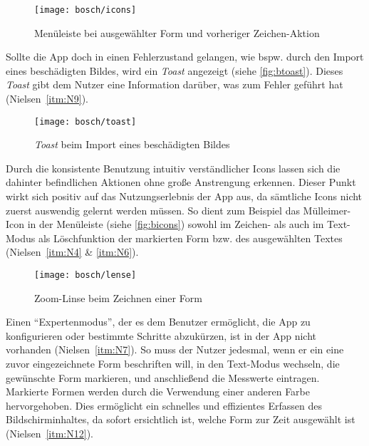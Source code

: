 \begin{figure}[h]
  \centering
  \texttt{[image: bosch/icons]}
  \caption{Menüleiste bei ausgewählter Form und vorheriger Zeichen-Aktion}
  \label{fig:bicons}
\end{figure}

Sollte die App doch in einen Fehlerzustand gelangen, wie bspw. durch den Import eines beschädigten Bildes, wird ein \emph{Toast} angezeigt (siehe \autoref{fig:btoast}).
Dieses \emph{Toast} gibt dem Nutzer eine Information darüber, was zum Fehler geführt hat (Nielsen~\autoref{itm:N9}).

\begin{figure}[h]
  \centering
  \texttt{[image: bosch/toast]}
  \caption{\emph{Toast} beim Import eines beschädigten Bildes}
  \label{fig:btoast}
\end{figure}

Durch die konsistente Benutzung intuitiv verständlicher Icons lassen sich die dahinter befindlichen Aktionen ohne große Anstrengung erkennen.
Dieser Punkt wirkt sich positiv auf das Nutzungserlebnis der App aus, da sämtliche Icons nicht zuerst auswendig gelernt werden müssen.
So dient zum Beispiel das Mülleimer-Icon in der Menüleiste (siehe \autoref{fig:bicons}) sowohl im Zeichen- als auch im Text-Modus als Löschfunktion der markierten Form bzw. des ausgewählten Textes (Nielsen~\autoref{itm:N4} \& \autoref{itm:N6}). \\

\begin{wrapfigure}{R}{0.4\textwidth}
  \centering
  \texttt{[image: bosch/lense]}
  \caption{Zoom-Linse beim Zeichnen einer Form}
  \label{fig:blense}
\end{wrapfigure}

Einen ``Expertenmodus'', der es dem Benutzer ermöglicht, die App zu konfigurieren oder bestimmte Schritte abzukürzen, ist in der App nicht vorhanden (Nielsen~\autoref{itm:N7}).
So muss der Nutzer jedesmal, wenn er ein eine zuvor eingezeichnete Form beschriften will, in den Text-Modus wechseln, die gewünschte Form markieren, und anschließend die Messwerte eintragen.  \\

Markierte Formen werden durch die Verwendung einer anderen Farbe hervorgehoben.
Dies ermöglicht ein schnelles und effizientes Erfassen des Bildschirminhaltes, da sofort ersichtlich ist, welche Form zur Zeit ausgewählt ist (Nielsen~\autoref{itm:N12}). \\ 

